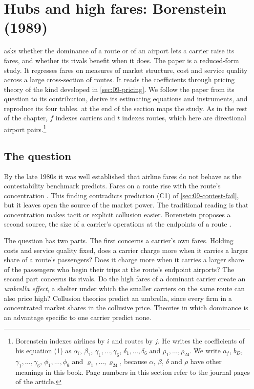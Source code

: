 \section{Hubs and high fares: Borenstein (1989)}\label{sec:09-borenstein}

\citet{Borenstein1989} asks whether the dominance of a route or of an airport lets a carrier raise its fares,
and whether its rivals benefit when it does. The paper is a reduced-form study. It regresses fares on measures
of market structure, cost and service quality across a large cross-section of routes. It reads the
coefficients through pricing theory of the kind developed in \cref{sec:09-pricing}. We follow the paper from
its question to its contribution, derive its estimating equations and instruments, and reproduce its four
tables.  at the end of the section maps the study. As in the rest of the chapter, $f$ indexes carriers and $t$ indexes routes, which here are directional
airport pairs.\footnote{Borenstein indexes airlines by $i$ and routes by $j$. He writes the coefficients of his
equation (1) as $\alpha_i$, $\beta_1$, $\gamma_1,\dots,\gamma_6$, $\delta_1,\dots,\delta_6$ and
$\rho_1,\dots,\rho_{24}$. We write $a_f$, $b_D$, $\gamma_1,\dots,\gamma_6$, $\phi_1,\dots,\phi_6$ and
$\varrho_1,\dots,\varrho_{24}$, because $\alpha$, $\beta$, $\delta$ and $\rho$ have other meanings in this
book. Page numbers in this section refer to the journal pages of the article.}

\subsection{The question}\label{sec:09-bor-question}

By the late 1980s it was well established that airline fares do not behave as the contestability benchmark
predicts. Fares on a route rise with the route's concentration
\citep{GrahamKaplanSibley1983,BaileyGrahamKaplan1985,CallKeeler1985,MorrisonWinston1987}. This finding
contradicts prediction (C1) of \cref{sec:09-contest-fail}, but it leaves open the source of the market power.
The traditional reading is that concentration makes tacit or explicit collusion easier. Borenstein proposes a
second source, the size of a carrier's operations at the endpoints of a route \citep[pp.~344--345]{Borenstein1989}.

The question has two parts. The first concerns a carrier's own fares. Holding costs and service quality fixed,
does a carrier charge more when it carries a larger share of a route's passengers? Does it charge more when it
carries a larger share of the passengers who begin their trips at the route's endpoint airports? The second part concerns its rivals. Do the
high fares of a dominant carrier create an \emph{umbrella effect}, a shelter under which the smaller carriers
on the same route can also price high? Collusion theories predict an umbrella, since every firm in a
concentrated market shares in the collusive price. Theories in which dominance is an advantage specific to one
carrier predict none.


